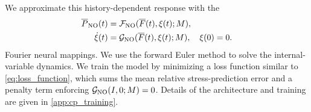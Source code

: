 \documentclass[3p, 12pt, preprint]{elsarticle}
\begin{document}
We approximate this history-dependent response with the 
\begin{align*}
    \overline{P}_{\mathrm{NO}}(t) &= {\mathcal{F}}_{\mathrm{NO}}(\overline{F}(t), \xi(t); M),\\
    \dot{\xi}(t) &= {\mathcal{G}}_{\mathrm{NO}}(\overline{F}(t),\xi(t); M),\quad \xi(0)=0{.}
\end{align*}
 Fourier neural mappings. We use the forward Euler method to solve the internal-variable dynamics. We train the model by minimizing a loss function similar to \cref{eq:loss_function}, which sums the mean relative stress-prediction error and a penalty term enforcing ${\mathcal{G}}_{\rm NO}(I, 0;M)=0$. Details of the architecture and training are given in \cref{app:cp_training}.
\end{document}
